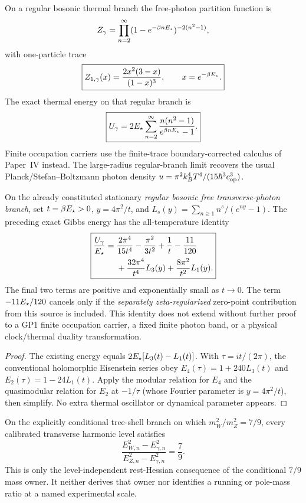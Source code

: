 \documentclass[11pt,a4paper]{article}
\begin{document}
On a regular bosonic thermal branch the free-photon partition function is
\[
 Z_\gamma=\prod_{n=2}^\infty
 (1-e^{-\beta nE_\star})^{-2(n^2-1)},
\]
with one-particle trace
\[
 \boxed{Z_{1,\gamma}(x)=\frac{2x^2(3-x)}{(1-x)^3},
 \qquad x=e^{-\beta E_\star}.}
\]
The exact thermal energy on that regular branch is
\[
 \boxed{U_\gamma
 =2E_\star\sum_{n=2}^\infty
 \frac{n(n^2-1)}{e^{\beta nE_\star}-1}.}
\]
Finite occupation carriers use the finite-trace boundary-corrected calculus of
Paper~IV instead.  The large-radius regular-branch limit recovers the usual
Planck/Stefan--Boltzmann photon density
\(u=\pi^2k_B^4T^4/(15\hbar^3c_{\rm op}^3)\).



\begin{corollary}
\label{p7v2:cor:v340-s3lit-photon-modular}
On the already constituted stationary \emph{regular bosonic free
transverse-photon branch}, set $t=\beta E_\star>0$,
$y=4\pi^2/t$, and $L_s(y)=\sum_{n\ge1}n^s/(e^{ny}-1)$.
The preceding exact Gibbs energy has the all-temperature identity
\[
 \boxed{\begin{aligned}
 \frac{U_\gamma}{E_\star}={}&\frac{2\pi^4}{15t^4}
 -\frac{\pi^2}{3t^2}+\frac1t-\frac{11}{120}\\
 &+\frac{32\pi^4}{t^4}L_3(y)
 +\frac{8\pi^2}{t^2}L_1(y).
 \end{aligned}}
\]
The final two terms are positive and exponentially small as $t\to0$.
The term $-11E_\star/120$ cancels only if the \emph{separately
zeta-regularized} zero-point contribution from this source is included.
This identity does not extend without further proof to a GP1 finite
occupation carrier, a fixed finite photon band, or a physical
clock/thermal duality transformation.
\end{corollary}
\begin{proof}
The existing energy equals
$2E_\star[L_3(t)-L_1(t)]$.  With
$\tau=it/(2\pi)$, the conventional holomorphic Eisenstein series
obey $E_4(\tau)=1+240L_3(t)$ and
$E_2(\tau)=1-24L_1(t)$.  Apply the modular relation for $E_4$
and the quasimodular relation for $E_2$ at
$-1/\tau$ (whose Fourier parameter is $y=4\pi^2/t$), then
simplify.  No extra thermal oscillator or dynamical parameter appears.
\end{proof}

\begin{proposition}
\label{p7v2:prop:v247-seven-nine-all-level}
On the explicitly conditional tree-shell branch on which
\(m_W^2/m_Z^2=7/9\), every calibrated transverse harmonic level satisfies
\[
 \boxed{
 \frac{E_{W,n}^2-E_{\gamma,n}^2}
 {E_{Z,n}^2-E_{\gamma,n}^2}=\frac79.}
\]
This is only the level-independent rest-Hessian consequence of the conditional
\(7/9\) mass owner.  It neither derives that owner nor identifies a running
or pole-mass ratio at a named experimental scale.
\end{proposition}
\end{document}
